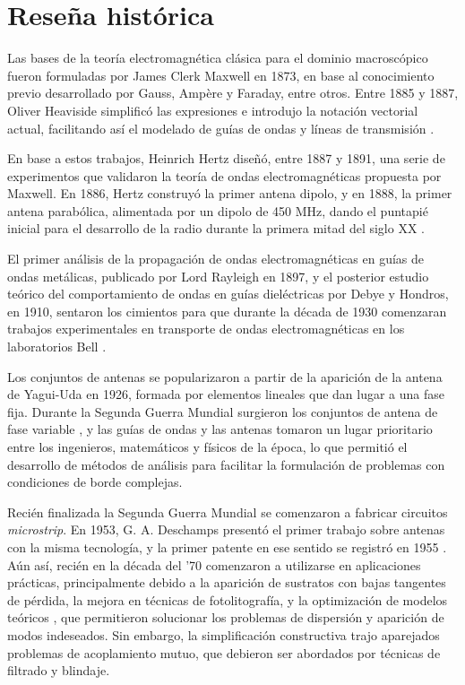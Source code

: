 
\section{Reseña histórica}
\label{sec_intro_resenia}

Las bases de la teoría electromagnética clásica para el dominio macroscópico fueron formuladas por James Clerk Maxwell en 1873, en base al conocimiento previo desarrollado por Gauss, Ampère y Faraday, entre otros. Entre 1885 y 1887, Oliver Heaviside simplificó las expresiones e introdujo la notación vectorial actual, facilitando así el modelado de guías de ondas y líneas de transmisión \cite{Pozar:MwEngineering}.

En base a estos trabajos, Heinrich Hertz diseñó, entre 1887 y 1891, una serie de experimentos que validaron la teoría de ondas electromagnéticas propuesta por Maxwell. En 1886, Hertz construyó la primer antena dipolo, y en 1888, la primer antena parabólica, alimentada por un dipolo de 450 MHz, dando el puntapié inicial para el desarrollo de la radio durante la primera mitad del siglo \textsc{XX} \cite{Collin:GuidedWaves}.

El primer análisis de la propagación de ondas electromagnéticas en guías de ondas metálicas, publicado por Lord Rayleigh en 1897, y el posterior estudio teórico del comportamiento de ondas en guías dieléctricas por Debye y Hondros, en 1910, sentaron los cimientos para que durante la década de 1930 comenzaran trabajos experimentales en transporte de ondas electromagnéticas en los laboratorios Bell \cite{Collin:GuidedWaves}.

Los conjuntos de antenas se popularizaron a partir de la aparición de la antena de Yagui-Uda en 1926, formada por elementos lineales que dan lugar a una fase fija. Durante la Segunda Guerra Mundial surgieron los conjuntos de antena de fase variable \cite{Stutzman:AntennaTheory}, y las guías de ondas y las antenas tomaron un lugar prioritario entre los ingenieros, matemáticos y físicos de la época, lo que permitió el desarrollo de métodos de análisis para facilitar la formulación de problemas con condiciones de borde complejas.

Recién finalizada la Segunda Guerra Mundial se comenzaron a fabricar circuitos \textit{microstrip}. En 1953, G. A. Deschamps presentó el primer trabajo sobre antenas con la misma tecnología, y la primer patente en ese sentido se registró en 1955 \cite{Balanis:Handbook}. Aún así, recién en la década del '70 comenzaron a utilizarse en aplicaciones prácticas, principalmente debido a la aparición de sustratos con bajas tangentes de pérdida, la mejora en técnicas de fotolitografía, y la optimización de modelos teóricos \cite{Barthia:Handbook}, que permitieron solucionar los problemas de dispersión y aparición de modos indeseados. Sin embargo, la simplificación constructiva trajo aparejados problemas de acoplamiento mutuo, que debieron ser abordados por técnicas de filtrado y blindaje.

